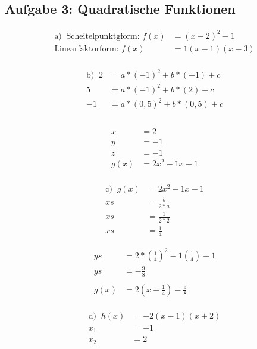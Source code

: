 \documentclass[a4paper]{article}
\begin{document}
\subsection*{\textbf{Aufgabe 3: Quadratische Funktionen}}
	\begin{figure}[h]
		\begin{minipage}{0\textwidth}
			\begin{align*}	
				\text{a)	}\
				\text{Scheitelpunktgform: }f(x) &= (x - 2)^{2} - 1 \\	
				\text{Linearfaktorform: } f(x) &= 1(x - 1)(x - 3)	\\ 
			\end{align*}
		\end{minipage}
		\begin{minipage}{0\textwidth}
			\begin{align*}
				\text{b)	} \
				2 &= a * (-1)^{2} + b * (-1) + c \\
				5 &= a * (-1)^{2} + b * (2)  + c \\
				-1 &= a * (0,5)^{2} + b * (0,5) + c\\ \\
			\end{align*}
		\end{minipage}
		\begin{minipage}{0.5\textwidth}
			\begin{align*}
				x &= 2 \\
				y &= -1 \\ 
				z &= -1 \\
				g(x) &= 2x^{2} - 1x -1\\
			\end{align*}
		\end{minipage}
		\begin{minipage}{0\textwidth}
			\begin{align*}
				\text{c)	}\
				g(x) &= 2x^{2} - 1x -1\\
				xs &= \frac{b}{2 * a} \\
				xs &= \frac{1}{2 * 2} \\
				xs &= \frac{1}{4}
			\end{align*}
		\end{minipage}
		\begin{minipage}{0.5\textwidth}
			\begin{align*}
				ys &=  2 * (\frac{1}{4})^{2} - 1(\frac{1}{4}) - 1 \\
				ys &= -\frac{9}{8} \\ \\
				g(x) &= 2 (x - \frac{1}{4}) - \frac{9}{8} \\
			\end{align*}
		\end{minipage}
		\begin{minipage}{0\textwidth}
			\begin{align*}
				\text{d)	}\
				h(x) &= -2(x - 1)(x + 2)\\
				x_{1}&= -1 \\
				x_{2}&= 2 \\
			\end{align*}
		\end{minipage}
	\end{figure}
\end{document}
